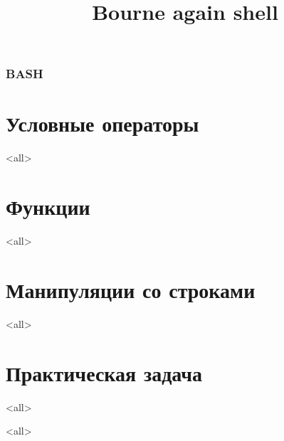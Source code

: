 
\title[bash]{Bourne again shell}




\begin{frame}
	\frametitle{BASH}
	\titlepage
	\vspace{-0.5cm}
	\begin{center}
	\end{center}
\end{frame}

\begin{frame}
	\tableofcontents
	[hideallsubsections]
\end{frame}


\section{Условные операторы}

\mode<all>{}

\section{Функции}

\mode<all>{}

\section{Манипуляции со строками}

\mode<all>{}

\section{Практическая задача}

\mode<all>{}

\mode<all>

